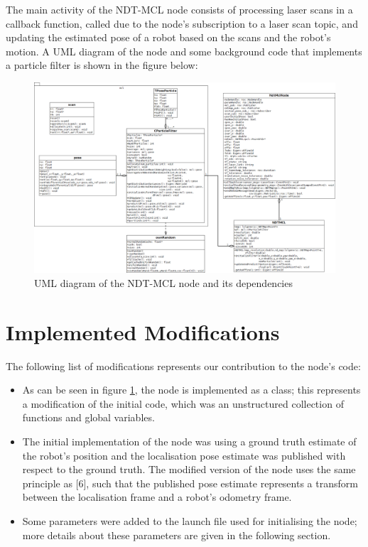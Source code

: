 \documentclass[12pt]{article}
\begin{document}
	The main activity of the NDT-MCL node consists of processing laser scans in a callback function, called due to the node's subscription to a laser scan topic, and updating the estimated pose of a robot based on the scans and the robot's motion. A UML diagram of the node and some background code that implements a particle filter is shown in the figure below:
	\begin{figure}[H]
		\center
		\includegraphics[width=160mm]{ndtmcl.png}
		\caption{UML diagram of the NDT-MCL node and its dependencies}
		\label{fig:umlDiagram}
	\end{figure}

	\section{Implemented Modifications}
	\label{sec:implementedModifications}

	The following list of modifications represents our contribution to the node's code:

	\begin{itemize}
		\item As can be seen in figure \ref{fig:umlDiagram}, the node is implemented as a class; this represents a modification of the initial code, which was an unstructured collection of functions and global variables.
		\item The initial implementation of the node was using a ground truth estimate of the robot's position and the localisation pose estimate was published with respect to the ground truth. The modified version of the node uses the same principle as [6], such that the published pose estimate represents a transform between the localisation frame and a robot's odometry frame.
		\item Some parameters were added to the launch file used for initialising the node; more details about these parameters are given in the following section.
	\end{itemize}
\end{document}
